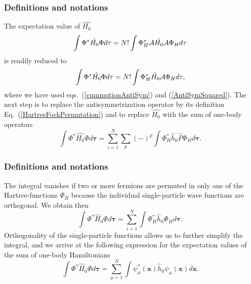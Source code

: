 \frame
{
  \frametitle{Definitions and notations}
\begin{small}
{\scriptsize
The expectation value of $\hat{H_0}$ 
\[
  \int \Phi^*\hat{H_0}\Phi d\mathbf{\tau} 
  = N! \int \Phi_H^*{\cal A}\hat{H_0}{\cal A}\Phi_H d\mathbf{\tau}
\]
is readily reduced to
\[
  \int \Phi^*\hat{H_0}\Phi d\mathbf{\tau} 
  = N! \int \Phi_H^*\hat{H_0}{\cal A}\Phi_H d\mathbf{\tau},
\]
where we have used eqs.~(\ref{cummutionAntiSym}) and
(\ref{AntiSymSquared}). The next step is to replace the antisymmetrization
operator by its definition Eq.~(\ref{HartreeFockPermutation}) and to
replace $\hat{H_0}$ with the sum of one-body operators
\[
  \int \Phi^*\hat{H_0}\Phi  d\mathbf{\tau}
  = \sum_{i=1}^N \sum_{p} (-)^p\int 
  \Phi_H^*\hat{h}_0\hat{P}\Phi_H d\mathbf{\tau}.
\]

}
\end{small}
}

\frame
{
  \frametitle{Definitions and notations}
\begin{small}
{\scriptsize
The integral vanishes if two or more fermions are permuted in only one
of the Hartree-functions $\Phi_H$ because the individual single-particle wave functions are
orthogonal. We obtain then
\[
  \int \Phi^*\hat{H}_0\Phi  d\mathbf{\tau}= \sum_{i=1}^N \int \Phi_H^*\hat{h}_0\Phi_H  d\mathbf{\tau}.
\]
Orthogonality of the single-particle functions allows us to further simplify the integral, and we
arrive at the following expression for the expectation values of the
sum of one-body Hamiltonians 
\begin{equation}
  \int \Phi^*\hat{H}_0\Phi  d\mathbf{\tau}
  = \sum_{\mu=1}^N \int \psi_{\mu}^*(\mathbf{x})\hat{h}_0\psi_{\mu}(\mathbf{x})
  d\mathbf{x}.
  \label{H1Expectation}
\end{equation}

}
\end{small}
}

